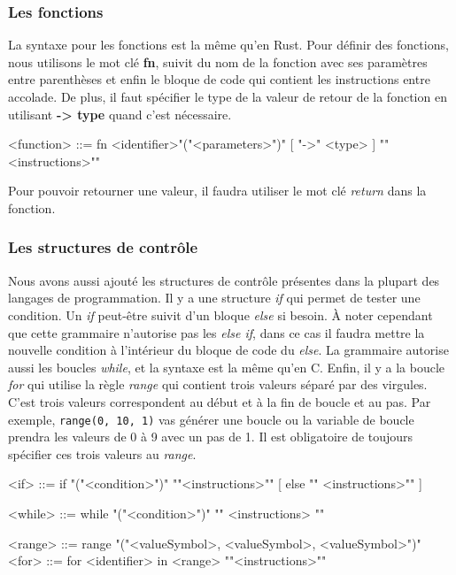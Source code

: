 \documentclass[a4paper]{article}%
\begin{document}
\subsubsection*{Les fonctions}

La syntaxe pour les fonctions est la même qu'en Rust. Pour définir des
fonctions, nous utilisons le mot clé \textbf{fn}, suivit du nom de la fonction
avec ses paramètres entre parenthèses et enfin le bloque de code qui contient
les instructions entre accolade. De plus, il faut spécifier le type de la valeur
de retour de la fonction en utilisant \textbf{-> type} quand c'est nécessaire.

\begin{grammar}
<function> ::= fn <identifier>"("<parameters>")" [ "->" <type> ] "{"<instructions>"}"
\end{grammar}\leavevmode\newline

Pour pouvoir retourner une valeur, il faudra utiliser le mot clé \textit{return}
dans la fonction.

\subsubsection*{Les structures de contrôle}

Nous avons aussi ajouté les structures de contrôle présentes dans la plupart des
langages de programmation. Il y a une structure \textit{if} qui permet de tester
une condition. Un \textit{if} peut-être suivit d'un bloque \textit{else} si
besoin. À noter cependant que cette grammaire n'autorise pas les \textit{else
if}, dans ce cas il faudra mettre la nouvelle condition à l'intérieur du bloque
de code du \textit{else}. La grammaire autorise aussi les boucles
\textit{while}, et la syntaxe est la même qu'en C. Enfin, il y a la boucle
\textit{for} qui utilise la règle \textit{range} qui contient trois valeurs
séparé par des virgules. C'est trois valeurs correspondent au début et à la fin
de boucle et au pas. Par exemple, \lstinline{range(0, 10, 1)} vas générer une
boucle ou la variable de boucle prendra les valeurs de 0 à 9 avec un pas de 1.
Il est obligatoire de toujours spécifier ces trois valeurs au \textit{range}.

\begin{grammar}
<if> ::= if "("<condition>")" "{"<instructions>"}" [ else "{" <instructions>"}" ]

<while> ::= while "("<condition>")" "{" <instructions> "}"

<range> ::= range "("<valueSymbol>, <valueSymbol>, <valueSymbol>")"
<for> ::= for <identifier> in <range> "{"<instructions>"}"
\end{grammar}\leavevmode\newline
\end{document}
